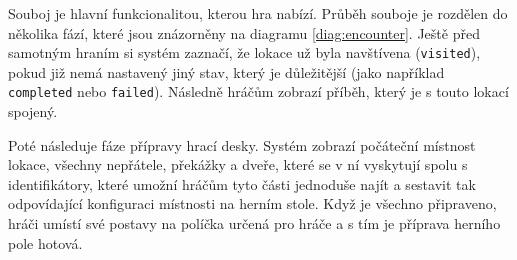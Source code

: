 Souboj je hlavní funkcionalitou, kterou hra nabízí. Průběh souboje je rozdělen do několika fází, které jsou znázorněny na diagramu \ref{diag:encounter}. Ještě před samotným hraním si systém zaznačí, že lokace už byla navštívena (\texttt{visited}), pokud již nemá nastavený jiný stav, který je důležitější (jako například \texttt{completed} nebo \texttt{failed}). Následně hráčům zobrazí příběh, který je s touto lokací spojený.

Poté následuje fáze přípravy hrací desky. Systém zobrazí počáteční místnost lokace, všechny nepřátele, překážky a dveře, které se v ní vyskytují spolu s identifikátory, které umožní hráčům tyto části jednoduše najít a sestavit tak odpovídající konfiguraci místnosti na herním stole. Když je všechno připraveno, hráči umístí své postavy na políčka určená pro hráče a s tím je příprava herního pole hotová.

